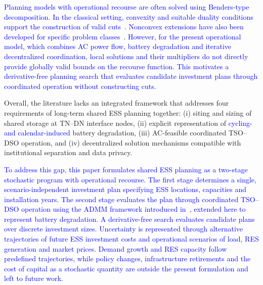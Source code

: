 \documentclass[preprint,12pt]{elsarticle}
\begin{document}
\textcolor{blue}{
    Planning models with operational recourse are often solved using Benders-type decomposition. In the classical setting, convexity and suitable duality conditions support the construction of valid cuts~\cite{geoffrion_1972}. Nonconvex extensions have also been developed for specific problem classes~\cite{li_tomasgard_barton_2011}. However, for the present operational model, which combines AC power flow, battery degradation and iterative decentralized coordination, local solutions and their multipliers do not directly provide globally valid bounds on the recourse function. This motivates a derivative-free planning search that evaluates candidate investment plans through coordinated operation without constructing cuts.
}

Overall, the literature lacks an integrated framework that addresses four requirements of long-term shared ESS planning together:
(i) siting and sizing of shared storage at TN--DN interface nodes,
(ii) explicit representation of \textcolor{blue}{cycling- and calendar-induced} battery degradation,
(iii) AC-feasible coordinated TSO--DSO operation, and
(iv) decentralized solution mechanisms compatible with institutional separation and data privacy.

\textcolor{blue}{
    To address this gap, this paper formulates shared ESS planning as a two-stage stochastic program with operational recourse. The first stage determines a single, scenario-independent investment plan specifying ESS locations, capacities and installation years. The second stage evaluates the plan through coordinated TSO--DSO operation using the ADMM framework introduced in~\cite{simoes_2023}, extended here to represent battery degradation. A derivative-free search evaluates candidate plans over discrete investment sizes. Uncertainty is represented through alternative trajectories of future ESS investment costs and operational scenarios of load, RES generation and market prices.
    Demand growth and RES capacity follow predefined trajectories, while policy changes, infrastructure retirements and the cost of capital as a stochastic quantity are outside the present formulation and left to future work.
}
\end{document}
